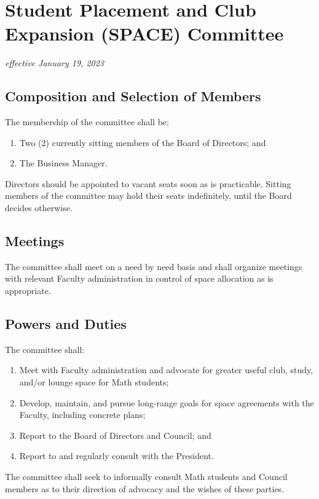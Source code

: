 \section{Student Placement and Club Expansion (SPACE) Committee}
\emph{effective January 19, 2023}

\subsection{Composition and Selection of Members}
The membership of the committee shall be:
\begin{enumerate}
    \item Two (2) currently sitting members of the Board of Directors; and
    \item The Business Manager.
\end{enumerate}

Directors should be appointed to vacant seats soon as is practicable. Sitting members of the committee may hold their seats indefinitely, until the Board decides otherwise.

\subsection{Meetings}
The committee shall meet on a need by need basis and shall organize meetings with relevant Faculty administration in control of space allocation as is appropriate.

\subsection{Powers and Duties}
The committee shall: 
\begin{enumerate}
    \item Meet with Faculty administration and advocate for greater useful club, study, and/or lounge space for Math students;
    \item Develop, maintain, and pursue long-range goals for space agreements with the Faculty, including concrete plans;
    \item Report to the Board of Directors and Council; and
    \item Report to and regularly consult with the President.
\end{enumerate}
The committee shall seek to informally consult Math students and Council members as to their direction of advocacy and the wishes of these parties.
